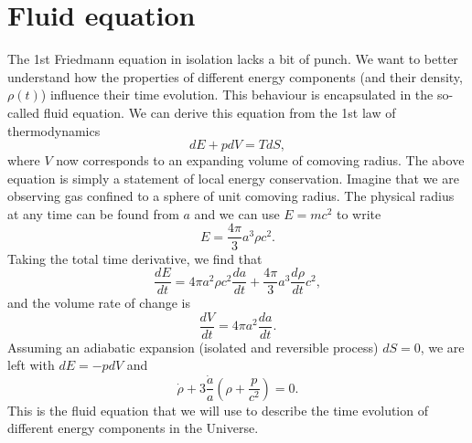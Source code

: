 \documentclass[a4paper,12pt]{article}
\theoremstyle{remark}
\renewcommand{\=}[1]{\stackrel{#1}{=}} %
\theoremstyle{plain}
\theoremstyle{definition}
\begin{document}
\section{Fluid equation}
The 1st Friedmann equation in isolation lacks a bit of punch. We want to better understand how the properties of different energy components (and their density, $\rho(t)$) influence their time evolution. This behaviour is encapsulated in the so-called fluid equation. We can derive this equation from the 1st law of thermodynamics
\begin{equation}
dE + pdV = TdS,
\end{equation}
where $V$ now corresponds to an expanding volume of comoving radius. The above equation is simply a statement of local energy conservation. Imagine that we are observing gas confined to a sphere of unit comoving radius. The physical radius at any time can be found from $a$ and we can use $E = mc^{2}$ to write
\begin{equation}
E = \frac{4\pi}{3} a^{3} \rho c^{2}.
\end{equation}
Taking the total time derivative, we find that
\begin{equation}
\frac{dE}{dt} = 4\pi a^{2} \rho c^{2} \frac{da}{dt} + \frac{4\pi}{3} a^{3} \frac{d\rho}{dt} c^{2},
\end{equation}
and the volume rate of change is
\begin{equation}
\frac{dV}{dt} = 4\pi a^{2}\frac{da}{dt}.
\end{equation}
Assuming an adiabatic expansion (isolated and reversible process) $dS=0$, we are left with $dE = - pdV$ and
\begin{equation}
\dot{\rho} + 3\frac{\dot{a}}{a} \left(\rho + \frac{p}{c^{2}} \right) = 0.
\label{eq:fluid}
\end{equation}
This is the fluid equation that we will use to describe the time evolution of different energy components in the Universe. 
\end{document}
